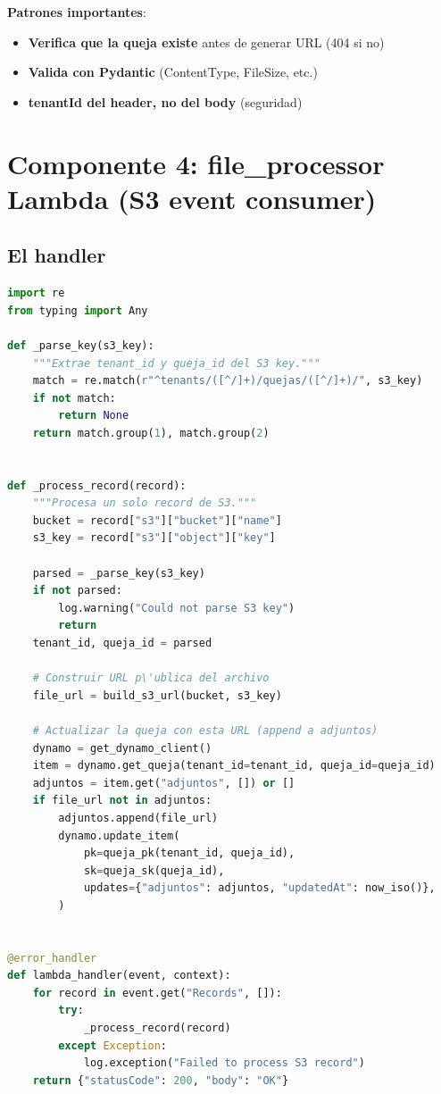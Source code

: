 \documentclass[11pt,a4paper,oneside]{article}
\newcommand{\ok}{\textcolor{okgreen}{\textbf{\checkmark}}}
\begin{document}
\textbf{Patrones importantes}:
\begin{itemize}
  \item \ok \textbf{Verifica que la queja existe} antes de generar URL (404 si no)
  \item \ok \textbf{Valida con Pydantic} (ContentType, FileSize, etc.)
  \item \ok \textbf{tenantId del header, no del body} (seguridad)
\end{itemize}

\section{Componente 4: file\_processor Lambda (S3 event consumer)}

\subsection{El handler}

\begin{lstlisting}[language=Python,caption={src/handlers/file\_processor.py}]
import re
from typing import Any

def _parse_key(s3_key):
    """Extrae tenant_id y queja_id del S3 key."""
    match = re.match(r"^tenants/([^/]+)/quejas/([^/]+)/", s3_key)
    if not match:
        return None
    return match.group(1), match.group(2)


def _process_record(record):
    """Procesa un solo record de S3."""
    bucket = record["s3"]["bucket"]["name"]
    s3_key = record["s3"]["object"]["key"]

    parsed = _parse_key(s3_key)
    if not parsed:
        log.warning("Could not parse S3 key")
        return
    tenant_id, queja_id = parsed

    # Construir URL p\'ublica del archivo
    file_url = build_s3_url(bucket, s3_key)

    # Actualizar la queja con esta URL (append a adjuntos)
    dynamo = get_dynamo_client()
    item = dynamo.get_queja(tenant_id=tenant_id, queja_id=queja_id)
    adjuntos = item.get("adjuntos", []) or []
    if file_url not in adjuntos:
        adjuntos.append(file_url)
        dynamo.update_item(
            pk=queja_pk(tenant_id, queja_id),
            sk=queja_sk(queja_id),
            updates={"adjuntos": adjuntos, "updatedAt": now_iso()},
        )


@error_handler
def lambda_handler(event, context):
    for record in event.get("Records", []):
        try:
            _process_record(record)
        except Exception:
            log.exception("Failed to process S3 record")
    return {"statusCode": 200, "body": "OK"}
\end{lstlisting}
\end{document}
